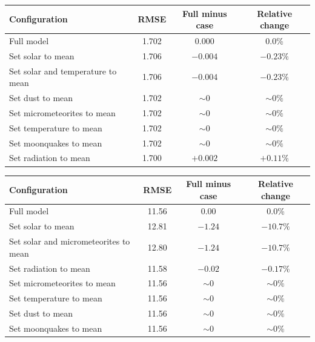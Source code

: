 \begin{center}
\centering
\begin{tabular}{@{}lccc@{}}
\toprule
Configuration & RMSE & Full minus case & Relative change \\
\midrule
Full model & 1.702 & 0.000 & 0.0\% \\
Set solar to mean & 1.706 & $-0.004$ & $-0.23\%$ \\
Set solar and temperature to mean & 1.706 & $-0.004$ & $-0.23\%$ \\
Set dust to mean & 1.702 & ${\sim}0$ & ${\sim}0\%$ \\
Set micrometeorites to mean & 1.702 & ${\sim}0$ & ${\sim}0\%$ \\
Set temperature to mean & 1.702 & ${\sim}0$ & ${\sim}0\%$ \\
Set moonquakes to mean & 1.702 & ${\sim}0$ & ${\sim}0\%$ \\
Set radiation to mean & 1.700 & $+0.002$ & $+0.11\%$ \\
\bottomrule
\end{tabular}
\label{tab:ablation-rad}
\end{center}

\begin{center}
\centering
\begin{tabular}{@{}lccc@{}}
\toprule
Configuration & RMSE & Full minus case & Relative change \\
\midrule
Full model & 11.56 & 0.00 & 0.0\% \\
Set solar to mean & 12.81 & $-1.24$ & $-10.7\%$ \\
Set solar and micrometeorites to mean & 12.80 & $-1.24$ & $-10.7\%$ \\
Set radiation to mean & 11.58 & $-0.02$ & $-0.17\%$ \\
Set micrometeorites to mean & 11.56 & ${\sim}0$ & ${\sim}0\%$ \\
Set temperature to mean & 11.56 & ${\sim}0$ & ${\sim}0\%$ \\
Set dust to mean & 11.56 & ${\sim}0$ & ${\sim}0\%$ \\
Set moonquakes to mean & 11.56 & ${\sim}0$ & ${\sim}0\%$ \\
\bottomrule
\end{tabular}
\label{tab:ablation-solar}
\end{center}
